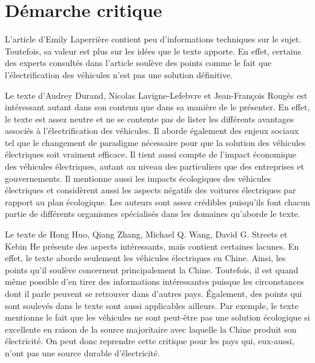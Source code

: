 
\chapter{Démarche critique}

L'article  d'Emily Laperrière contient peu d'informations techniques sur le sujet. Toutefois, sa valeur est plus sur les idées que le texte apporte. En effet, certains des experts consultés dans l'article soulève des points comme le fait que l'électrification des véhicules n'est pas une solution définitive. 

Le texte  d'Audrey Durand, Nicolas Lavigne-Lefebvre et Jean-François Rougès est intéressant autant dans son contenu que dans sa manière de le présenter. En effet, le texte est assez neutre et ne se contente pas de lister les différents avantages associés à l'électrification des véhicules. Il aborde également des enjeux sociaux tel que le changement de paradigme nécessaire pour que la solution des véhicules électriques soit vraiment efficace. Il tient aussi compte de l'impact économique des véhicules électriques, autant au niveau des particuliers que des entreprises et gouvernements. Il mentionne aussi les impacts écologiques des véhicules électriques et considèrent aussi les aspects négatifs des voitures électriques par rapport au plan écologique. Les auteurs sont assez crédibles puisqu'ils font chacun partie de différents organismes spécialisés dans les domaines qu'aborde le texte.

Le texte  de Hong Huo, Qiang Zhang, Michael Q. Wang, David G. Streets et Kebin He présente des aspects intéressants, mais contient certaines lacunes. En effet, le texte aborde seulement les véhicules électriques en Chine. Ainsi, les points qu'il soulève concernent principalement la Chine. Toutefois, il est quand même possible d'en tirer des informations intéressantes puisque les circonstances dont il parle peuvent se retrouver dans d'autres pays. Également, des points qui sont soulevés dans le texte sont aussi applicables ailleurs. Par exemple, le texte mentionne le fait que les véhicules ne sont peut-être pas une solution écologique si excellente en raison de la source majoritaire avec laquelle la Chine produit son électricité. On peut donc reprendre cette critique pour les pays qui, eux-aussi, n'ont pas une source durable d'électricité.

